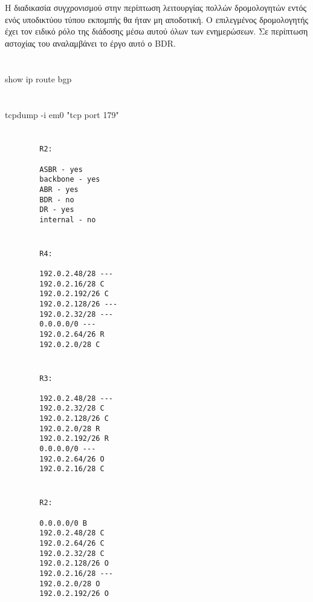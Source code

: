\documentclass[a4paper, 12pt]{article}
\begin{document}
\section{}
	Η διαδικασία συγχρονισμού στην περίπτωση
	λειτουργίας πολλών δρομολογητών εντός ενός υποδικτύου τύπου εκπομπής θα ήταν μη αποδοτική. Ο επιλεγμένος δρομολογητής έχει τον ειδικό ρόλο της διάδοσης μέσω αυτού όλων των ενημερώσεων. Σε περίπτωση αστοχίας του αναλαμβάνει το έργο αυτό ο BDR.

\section{}
	show ip route bgp

\section{}
	tcpdump -i em0 "tcp port 179"

\section{}
	\begin{verbatim}
		R2:
	
		ASBR - yes
		backbone - yes
		ABR - yes
		BDR - no
		DR - yes
		internal - no  
	\end{verbatim}

\section{}
	\begin{verbatim}
		R4:
		
		192.0.2.48/28 ---
		192.0.2.16/28 C
		192.0.2.192/26 C
		192.0.2.128/26 --- 
		192.0.2.32/28 --- 
		0.0.0.0/0 --- 
		192.0.2.64/26 R
		192.0.2.0/28 C
	\end{verbatim}

\section{}
	\begin{verbatim}
		R3:
		
		192.0.2.48/28 ---
		192.0.2.32/28 C
		192.0.2.128/26 C
		192.0.2.0/28 R
		192.0.2.192/26 R 
		0.0.0.0/0 ---
		192.0.2.64/26 O 
		192.0.2.16/28 C
	\end{verbatim}

\section{}
	\begin{verbatim}
		R2:
		
		0.0.0.0/0 B
		192.0.2.48/28 C 
		192.0.2.64/26 C
		192.0.2.32/28 C
		192.0.2.128/26 O
		192.0.2.16/28 ---
		192.0.2.0/28 O
		192.0.2.192/26 O 
	\end{verbatim}	
\end{document}
